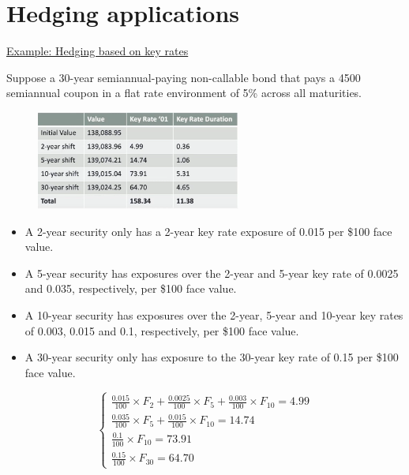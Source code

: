 \documentclass{article}
\begin{document}
\newpage

\section{Hedging applications}

\underline{Example: Hedging based on key rates}

Suppose a 30-year semiannual-paying non-callable bond that pays a 4500 semiannual coupon in a flat rate environment of 5\% across all maturities.

\begin{figure}[h]
    \centering    \includegraphics[width=0.6\textwidth]{hedging.png}
\end{figure}

\begin{itemize}
    \item A 2-year security only has a 2-year key rate exposure of 0.015 per \$100 face value.

    \item A 5-year security has exposures over the 2-year and 5-year key rate of 0.0025 and 0.035, respectively, per \$100 face value.

    \item A 10-year security has exposures over the 2-year, 5-year and 10-year key rates of 0.003, 0.015 and 0.1, respectively, per \$100 face value.
    
    \item A 30-year security only has exposure to the 30-year key rate of 0.15 per \$100 face value.
    
\end{itemize}
\begin{equation*}
    \left\{\begin{matrix}
    \frac{0.015}{100} \times F_2 + \frac{0.0025}{100} \times F_5 + \frac{0.003}{100} \times F_{10} = 4.99
    \\
    \frac{0.035}{100} \times F_5 + \frac{0.015}{100} \times F_{10} = 14.74
    \\
    \frac{0.1}{100} \times F_{10} = 73.91
    \\
    \frac{0.15}{100} \times F_{30} = 64.70
\end{matrix}\right.

\end{equation*}
\end{document}
